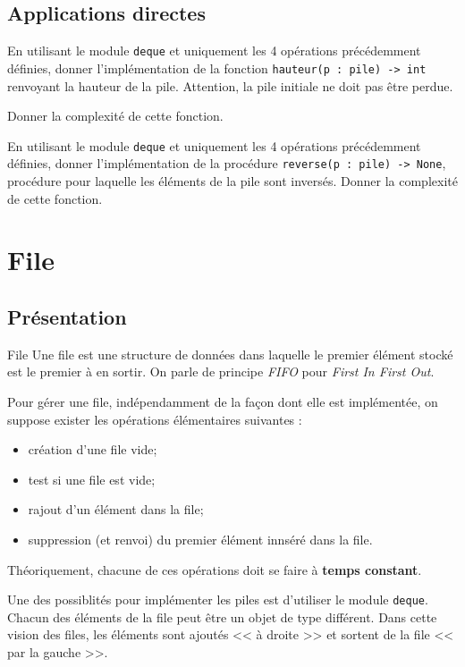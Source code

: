 \subsection{Applications directes}

\begin{exemple}
En utilisant le module \texttt{deque} et uniquement les 4 opérations précédemment définies, donner l'implémentation de la fonction \texttt{hauteur(p : pile) -> int} renvoyant la hauteur de la pile. Attention, la pile initiale ne doit pas être perdue.

Donner la complexité de cette fonction.
\end{exemple}


\begin{exemple}
En utilisant le module \texttt{deque} et uniquement les 4 opérations précédemment définies, donner l'implémentation de la procédure \texttt{reverse(p : pile) -> None}, procédure pour laquelle les éléments de la pile sont inversés. Donner la complexité de cette fonction.
\end{exemple}


\section{File}
\subsection{Présentation}
\begin{defi}{File}
Une file est une structure de données dans laquelle le premier élément stocké est le premier à en sortir. On parle de principe \textit{FIFO} pour \textit{First In First Out}. 
\end{defi}

Pour gérer une file, indépendamment de la façon dont elle est implémentée, on suppose exister les opérations élémentaires suivantes : 
\begin{itemize}
\item création d'une file vide;
\item test si une file est vide;
\item rajout d'un élément dans la file;
\item suppression (et renvoi) du premier élément innséré dans la file.
\end{itemize}

Théoriquement, chacune de ces opérations doit se faire à \textbf{temps constant}.

Une des possiblités pour implémenter les piles est d'utiliser le module \texttt{deque}. Chacun des éléments de la file peut être un objet de type différent. Dans cette vision des files, les éléments sont ajoutés << à droite >> et sortent de la file << par la gauche >>.

